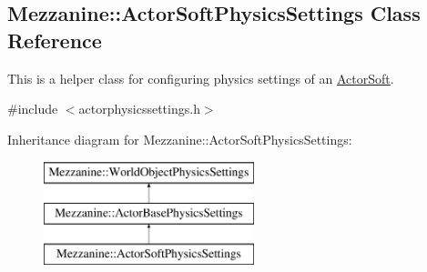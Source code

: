\hypertarget{classMezzanine_1_1ActorSoftPhysicsSettings}{
\subsection{Mezzanine::ActorSoftPhysicsSettings Class Reference}
\label{classMezzanine_1_1ActorSoftPhysicsSettings}
}


This is a helper class for configuring physics settings of an \hyperlink{classMezzanine_1_1ActorSoft}{ActorSoft}.  




{\ttfamily \#include $<$actorphysicssettings.h$>$}

Inheritance diagram for Mezzanine::ActorSoftPhysicsSettings:\begin{figure}[H]
\begin{center}
\leavevmode
\includegraphics[height=3.000000cm]{classMezzanine_1_1ActorSoftPhysicsSettings}
\end{center}
\end{figure}
